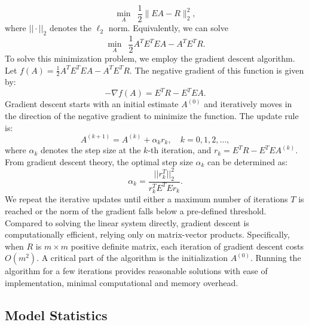 \begin{equation}
\label{eq:model_7a}
\min_{A}\,\,\, \frac{1}{2} \|E A - R\|_2^2,
\end{equation}
where $||\cdot||_2$ denotes the $\ell_2$ norm. Equivalently, we can solve
\begin{equation}
\label{eq:model_7b}
\min_{A}\,\,\, \frac{1}{2} A^T E^T E A - A^T E^T R.
\end{equation}
To solve this minimization problem, we employ the gradient descent algorithm. Let $f(A) = \frac{1}{2} A^T E^T E A - A^T E^T R$. The negative gradient of this function is given by:
\begin{equation}
\label{eq:model_7c}
-\nabla f(A) = E^T R - E^T E A.
\end{equation}
Gradient descent starts with an initial estimate $A^{(0)}$ and iteratively moves in the direction of the negative gradient to minimize the function. The update rule is:
\begin{equation}
\label{eq:model_7d}
 A^{(k+1)} = A^{(k)} + \alpha_k r_k, \quad k = 0, 1, 2, \dots,
\end{equation}
where $\alpha_k$ denotes the step size at the $k$-th iteration, and $r_k = E^T R - E^T E A^{(k)}$. From gradient descent theory, the optimal step size $\alpha_k$ can be determined as:
\begin{equation}
\label{eq:model_7e}
\alpha_k = \frac{||r_k^T||_2^2}{r_k^T E^T E r_k}.
\end{equation}
We repeat the iterative updates until either a maximum number of iterations $T$ is reached or the norm of the gradient falls below a pre-defined threshold. Compared to solving the linear system directly, gradient descent is computationally efficient, relying only on matrix-vector products. Specifically, when $R$ is $m\times m$ positive definite  matrix, each iteration of gradient descent costs $O(m^2)$. A critical part of the algorithm is the initialization $A^{(0)}$. Running the algorithm for a few iterations provides reasonable solutions with ease of implementation, minimal computational and memory overhead.

\subsection{Model Statistics}

